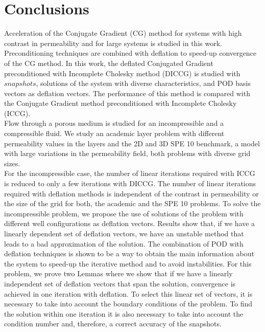 \documentclass[12pt]{article}
\begin{document}
\clearpage

\newpage


\section*{Conclusions}

Acceleration of the Conjugate Gradient (CG) method for systems with high contrast in permeability and for large systems is studied in this work. Preconditioning techniques are combined with deflation to speed-up convergence of the CG method. In this work, the deflated Conjugated Gradient preconditioned with Incomplete Cholesky method (DICCG) is studied with $snapshots$, solutions of the system with diverse characteristics, and POD basis vectors as deflation vectors. The performance of this method is compared with the Conjugate Gradient method preconditioned with Incomplete Cholesky (ICCG). \\
Flow through a porous medium is studied for an incompressible and a compressible fluid. We study an academic layer problem with different permeability values in the layers and the 2D and 3D SPE 10 benchmark, a model with large variations in the permeability field, both problems with diverse grid sizes.\\
For the incompressible case, the number of linear iterations required with ICCG is reduced to only a few iterations with DICCG. The number of linear iterations required with deflation methods is independent of the contrast in permeability or the size of the grid for both, the academic and the SPE 10 problems. To solve the incompressible problem, we propose the use of solutions of the problem with different well configurations as deflation vectors. Results show that, if we have a linearly dependent set of deflation vectors, we have an unstable method that leads to a bad approximation of the solution. The combination of POD with deflation techniques is shown to be a way to obtain the main information about the system to speed-up the iterative method and to avoid instabilities. For this problem, we prove two Lemmas where we show that if we have a linearly independent set of deflation vectors that span the solution, convergence is achieved in one iteration with deflation. To select this linear set of vectors, it is 
necessary to take into account the boundary conditions of the problem. To find the solution within one iteration it is also necessary to take into account the condition number and, therefore, a correct accuracy of the snapshots.  \\
\end{document}
